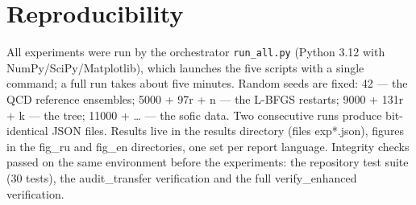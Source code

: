 \documentclass[11pt,a4paper]{article}
\begin{document}
\appendix
\section{Reproducibility}\label{sec:repro}

All experiments were run by the orchestrator \texttt{run\_all.py}
(Python 3.12 with NumPy/SciPy/Matplotlib), which launches the five scripts
with a single command; a full run takes about five minutes. Random seeds are
fixed: 42 --- the QCD reference ensembles;
5000 + 97r + n --- the L-BFGS restarts; 9000 + 131r + k --- the tree;
11000 + \ldots{} --- the sofic data. Two consecutive runs produce
bit-identical JSON files. Results live in the results directory (files
exp*.json), figures in the fig\_ru and fig\_en directories, one set per
report language. Integrity checks passed on the same environment before the
experiments: the repository test suite (30 tests), the audit\_transfer
verification and the full verify\_enhanced verification.
\end{document}

